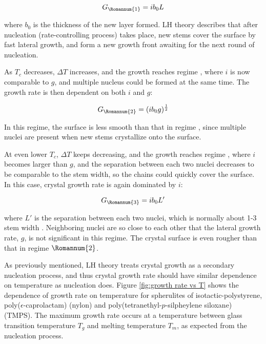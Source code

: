 \begin{equation}
\label{eqn_regime1}
G_{\Romannum{1}} = i b_{0} L
\end{equation}

\noindent
where $b_{0}$ is the thickness of the new layer formed. LH theory describes that after nucleation (rate-controlling process) takes place, new stems cover the surface by fast lateral growth, and form a new growth front awaiting for the next round of nucleation.

As $T_{c}$ decreases, $\Delta T$ increases, and the growth reaches regime , where $i$ is now comparable to $g$, and multiple nucleus could be formed at the same time. The growth rate is then dependent on both $i$ and $g$:

\begin{equation}
\label{eqn_regime2}
G_{\Romannum{2}} = (i b_{0} g)^{\frac{1}{2}}
\end{equation}

In this regime, the surface is less smooth than that in regime , since multiple nuclei are present when new stems crystallize onto the surface.

At even lower $T_{c}$, $\Delta T$ keeps decreasing, and the growth reaches regime , where $i$ becomes larger than $g$, and the separation between each two nuclei decreases to be comparable to the stem width, so the chains could quickly cover the surface. In this case, crystal growth rate is again dominated by $i$:

\begin{equation}
\label{eqn_regime3}
G_{\Romannum{3}} = i b_{0} L'
\end{equation}

\noindent
where $L'$ is the separation between each two nuclei, which is normally about 1-3 stem width \cite{Hoffman1983}. Neighboring nuclei are so close to each other that the lateral growth rate, $g$, is not significant in this regime. The crystal surface is even rougher than that in regime $\Romannum{2}$.

As previously mentioned, LH theory treats crystal growth as a secondary nucleation process, and thus crystal growth rate should have similar dependence on temperature as nucleation does. Figure \ref{fig:growth rate vs T} shows the dependence of growth rate on temperature for spherulites of isotactic-polystyrene, poly($\epsilon$-caprolactam) (nylon) and poly(tetranethyl-$p$-silpheylene siloxane) (TMPS). The maximum growth rate occurs at a temperature between glass transition temperature $T_{g}$ and melting temperature $T_{m}$, as expected from the nucleation process.

